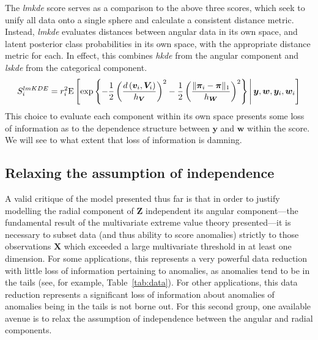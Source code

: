 The \emph{lmkde} score serves as a comparison to the above three scores, 
    which seek to unify all data onto a single sphere and calculate a 
    consistent distance metric.  Instead, \emph{lmkde} evaluates distances 
    between angular data in its own space, and latent posterior class 
    probabilities in its own space, with the appropriate distance metric for 
    each.  In effect, this combines \emph{hkde} from
    the angular component and \emph{lskde} from the categorical component.
    \[
    S_i^{lmKDE} = r_i^2 \text{E}\left[
        \exp
        \left\lbrace 
        -\frac{1}{2}
        \left(
        \frac{d\left(\bm{v}_i, \bm{V}_i\right)}{h_{\bm{V}}}
        \right)^2
        -\frac{1}{2}
        \left(
        \frac{\lVert\bm{\pi}_i - \bm{\pi}\rVert_1}{h_{\bm{W}}}
        \right)^2
        \right\rbrace
        \,\middle\vert\, \bm{y},\bm{w},\bm{y}_i,\bm{w}_i\right]
    \]
    This choice to evaluate each component within its own space presents some 
    loss of information as to the dependence structure between $\bm{y}$ and 
    $\bm{w}$ within the score.  We will see to what extent that loss of 
    information is damning.

\subsection{Relaxing the assumption of independence\label{subsec:rank}}
A valid critique of the model presented thus far is that in order to justify 
    modelling the radial component of $\bm{Z}$ independent its angular 
    component---the fundamental result of the multivariate extreme value theory 
    presented---it is necessary to subset data (and thus ability to score 
    anomalies) strictly to those observations $\bm{X}$ which exceeded a large 
    multivariate threshold in at least one dimension.  For some applications, 
    this represents a very powerful data reduction with little loss of 
    information pertaining to anomalies, as anomalies tend to be in the tails 
    (see, for  example, Table~\ref{tab:data}).  For other applications, this 
    data reduction represents a significant loss of information about anomalies 
    of anomalies being in the tails is not borne out.  For this second group, 
    one available avenue is to relax the assumption of independence between the 
    angular and radial components.

